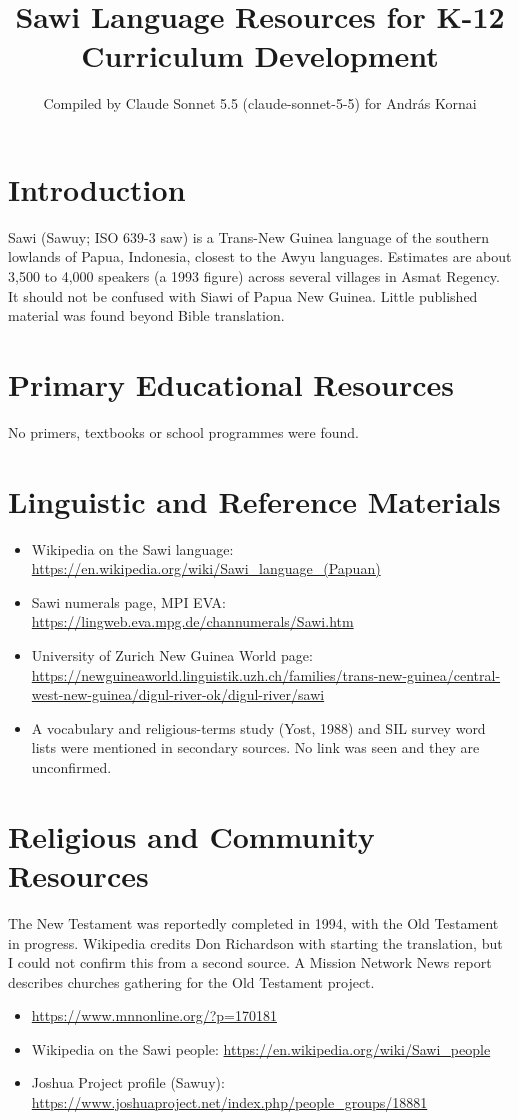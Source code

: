 \documentclass[12pt]{article}
\title{Sawi Language Resources for K-12 Curriculum Development}
\author{Compiled by Claude Sonnet 5.5 (claude-sonnet-5-5) for Andr\'as Kornai}
\date{}
\begin{document}
\maketitle

\section{Introduction}
Sawi (Sawuy; ISO 639-3 saw) is a Trans-New Guinea language of the southern lowlands of Papua, Indonesia, closest to the Awyu languages. Estimates are about 3,500 to 4,000 speakers (a 1993 figure) across several villages in Asmat Regency. It should not be confused with Siawi of Papua New Guinea. Little published material was found beyond Bible translation.

\section{Primary Educational Resources}
No primers, textbooks or school programmes were found.

\section{Linguistic and Reference Materials}
\begin{itemize}
\item Wikipedia on the Sawi language: \url{https://en.wikipedia.org/wiki/Sawi_language_(Papuan)}
\item Sawi numerals page, MPI EVA: \url{https://lingweb.eva.mpg.de/channumerals/Sawi.htm}
\item University of Zurich New Guinea World page: \url{https://newguineaworld.linguistik.uzh.ch/families/trans-new-guinea/central-west-new-guinea/digul-river-ok/digul-river/sawi}
\item A vocabulary and religious-terms study (Yost, 1988) and SIL survey word lists were mentioned in secondary sources. No link was seen and they are unconfirmed.
\end{itemize}

\section{Religious and Community Resources}
The New Testament was reportedly completed in 1994, with the Old Testament in progress. Wikipedia credits Don Richardson with starting the translation, but I could not confirm this from a second source. A Mission Network News report describes churches gathering for the Old Testament project.
\begin{itemize}
\item \url{https://www.mnnonline.org/?p=170181}
\item Wikipedia on the Sawi people: \url{https://en.wikipedia.org/wiki/Sawi_people}
\item Joshua Project profile (Sawuy): \url{https://www.joshuaproject.net/index.php/people_groups/18881}
\end{itemize}
\end{document}
